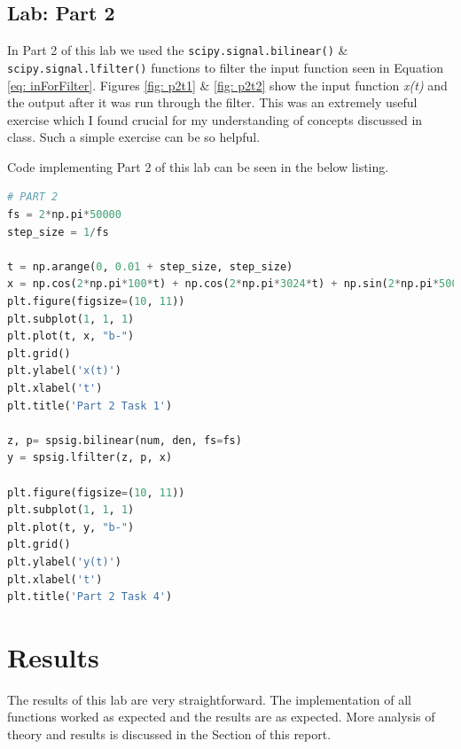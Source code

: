 \documentclass[12pt]{report}
\begin{document}
\subsection{Lab: Part 2}\label{Section: part2}
In Part 2 of this lab we used the \texttt{scipy.signal.bilinear()} \& \\\texttt{scipy.signal.lfilter()} functions to filter the 
input function seen in Equation \eqref{eq: inForFilter}. Figures \ref{fig: p2t1} \& \ref{fig: p2t2} show the input function \textit{x(t)}
and the output after it was run through the filter. This was an extremely useful exercise which I found crucial for my understanding
of concepts discussed in class. Such a simple exercise can be so helpful.

Code implementing Part 2 of this lab can be seen in the below listing.

\begin{lstlisting}[language=Python, basicstyle=\footnotesize]
# PART 2
fs = 2*np.pi*50000
step_size = 1/fs

t = np.arange(0, 0.01 + step_size, step_size)
x = np.cos(2*np.pi*100*t) + np.cos(2*np.pi*3024*t) + np.sin(2*np.pi*50000*t)
plt.figure(figsize=(10, 11))
plt.subplot(1, 1, 1)
plt.plot(t, x, "b-")
plt.grid()
plt.ylabel('x(t)')
plt.xlabel('t')
plt.title('Part 2 Task 1')

z, p= spsig.bilinear(num, den, fs=fs)
y = spsig.lfilter(z, p, x)

plt.figure(figsize=(10, 11))
plt.subplot(1, 1, 1)
plt.plot(t, y, "b-")
plt.grid()
plt.ylabel('y(t)')
plt.xlabel('t')
plt.title('Part 2 Task 4')
\end{lstlisting}

\section{Results}\label{section: Results}
The results of this lab are very straightforward. The implementation of all functions worked as expected and the results are as expected.
More analysis of theory and results is discussed in the  Section of this report.
\end{document}
